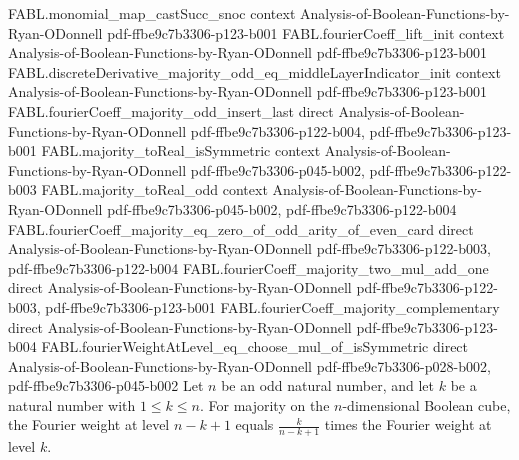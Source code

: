 \begin{theorem}
\proofstep
  {FABL.monomial_map_castSucc_snoc}
  {context}
  {Analysis-of-Boolean-Functions-by-Ryan-ODonnell}
  {pdf-ffbe9c7b3306-p123-b001}
\proofstep
  {FABL.fourierCoeff_lift_init}
  {context}
  {Analysis-of-Boolean-Functions-by-Ryan-ODonnell}
  {pdf-ffbe9c7b3306-p123-b001}
\proofstep
  {FABL.discreteDerivative_majority_odd_eq_middleLayerIndicator_init}
  {context}
  {Analysis-of-Boolean-Functions-by-Ryan-ODonnell}
  {pdf-ffbe9c7b3306-p123-b001}
\proofstep
  {FABL.fourierCoeff_majority_odd_insert_last}
  {direct}
  {Analysis-of-Boolean-Functions-by-Ryan-ODonnell}
  {pdf-ffbe9c7b3306-p122-b004,
    pdf-ffbe9c7b3306-p123-b001}
\proofstep
  {FABL.majority_toReal_isSymmetric}
  {context}
  {Analysis-of-Boolean-Functions-by-Ryan-ODonnell}
  {pdf-ffbe9c7b3306-p045-b002,
    pdf-ffbe9c7b3306-p122-b003}
\proofstep
  {FABL.majority_toReal_odd}
  {context}
  {Analysis-of-Boolean-Functions-by-Ryan-ODonnell}
  {pdf-ffbe9c7b3306-p045-b002,
    pdf-ffbe9c7b3306-p122-b004}
\proofstep
  {FABL.fourierCoeff_majority_eq_zero_of_odd_arity_of_even_card}
  {direct}
  {Analysis-of-Boolean-Functions-by-Ryan-ODonnell}
  {pdf-ffbe9c7b3306-p122-b003,
    pdf-ffbe9c7b3306-p122-b004}
\proofstep
  {FABL.fourierCoeff_majority_two_mul_add_one}
  {direct}
  {Analysis-of-Boolean-Functions-by-Ryan-ODonnell}
  {pdf-ffbe9c7b3306-p122-b003,
    pdf-ffbe9c7b3306-p123-b001}
\proofstep
  {FABL.fourierCoeff_majority_complementary}
  {direct}
  {Analysis-of-Boolean-Functions-by-Ryan-ODonnell}
  {pdf-ffbe9c7b3306-p123-b004}
\proofstep
  {FABL.fourierWeightAtLevel_eq_choose_mul_of_isSymmetric}
  {direct}
  {Analysis-of-Boolean-Functions-by-Ryan-ODonnell}
  {pdf-ffbe9c7b3306-p028-b002,
    pdf-ffbe9c7b3306-p045-b002}
Let $n$ be an odd natural number, and let $k$ be a natural number with $1\le k\le n$.
For majority on the $n$-dimensional Boolean cube, the Fourier weight at level $n-k+1$
equals $\frac{k}{n-k+1}$ times the Fourier weight at level $k$.
\end{theorem}
